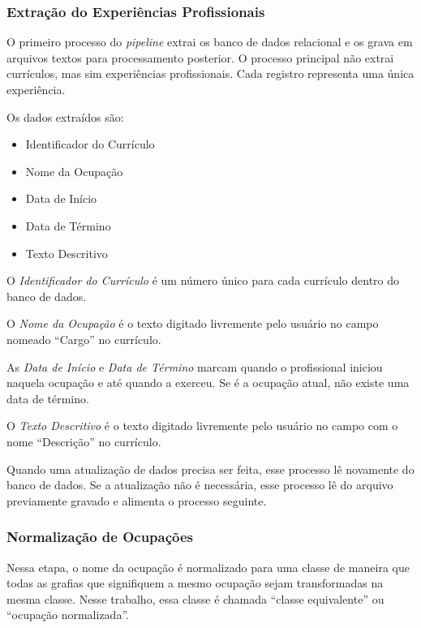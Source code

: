 \documentclass[12pt,a4paper]{article}
\begin{document}
\subsubsection{Extração do Experiências Profissionais} \label{sec:extracao-experiencia}

O primeiro processo do \textit{pipeline} extrai os banco de dados relacional e os grava em arquivos textos para processamento posterior. O processo principal não extrai currículos, mas sim experiências profissionais. Cada registro representa uma única experiência.

Os dados extraídos são:

\begin{itemize}
\item Identificador do Currículo
\item Nome da Ocupação
\item Data de Início
\item Data de Término
\item Texto Descritivo
\end{itemize}

O \textit{Identificador do Currículo} é um número único para cada currículo dentro do banco de dados.

O \textit{Nome da Ocupação} é o texto digitado livremente pelo usuário no campo nomeado \enquote{Cargo} no currículo.

As \textit{Data de Início} e \textit{Data de Término} marcam quando o profissional iniciou naquela ocupação e até quando a exerceu. Se é a ocupação atual, não existe uma data de término.

O \textit{Texto Descritivo} é o texto digitado livremente pelo usuário no campo com o nome \enquote{Descrição} no currículo.

Quando uma atualização de dados precisa ser feita, esse processo lê novamente do banco de dados. Se a atualização não é necessária, esse processo lê do arquivo previamente gravado e alimenta o processo seguinte.

\subsubsection{Normalização de Ocupações} \label{sec:normalizacao}

Nessa etapa, o nome da ocupação é normalizado para uma classe de maneira que todas as grafias que signifiquem a mesmo ocupação sejam transformadas na mesma classe. Nesse trabalho, essa classe é chamada \enquote{classe equivalente} ou \enquote{ocupação normalizada}.
\end{document}
